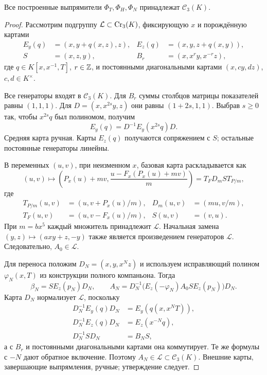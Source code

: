 \begin{proposition}\label{prop:cremona-membership}
Все построенные выпрямители $\Phi_T,\Phi_H,\Phi_N$ принадлежат
$\mathcal C_3(K)$.
\end{proposition}
\begin{proof}
Рассмотрим подгруппу $\mathcal L\subset\operatorname{Cr}_3(K)$,
фиксирующую $x$ и порождённую картами
\[
 \begin{aligned}
 E_y(q)&=(x,y+q(x,z),z),& E_z(q)&=(x,y,z+q(x,y)),\\
 S&=(x,z,y),&B_r&=(x,x^ry,x^{-r}z),
 \end{aligned}
\]
где $q\in K[x,x^{-1},T]$, $r\in{\mathbb Z}$, и постоянными
диагональными картами $(x,cy,dz)$, $c,d\in K^\times$.

Все генераторы входят в $\mathcal C_3(K)$.
Для $B_r$ суммы столбцов матрицы показателей равны $(1,1,1)$.
Для $D=(x,x^{2s}y,z)$ они равны $(1+2s,1,1)$.
Выбрав $s\ge0$ так, чтобы $x^{2s}q$ был полиномом, получим
\[
 E_y(q)=D^{-1}E_y(x^{2s}q)D.
\]
Средняя карта ручная. Карты $E_z(q)$ получаются сопряжением с $S$;
остальные постоянные генераторы линейны.

В переменных $(u,v)$, при неизменном $x$, базовая карта раскладывается как
\[
 (u,v)\longmapsto\left(P_x(u)+mv,
 \frac{u-F_x(P_x(u)+mv)}m\right)
 =T_FD_mST_{P/m},
\]
где
\[
 \begin{aligned}
 T_{P/m}(u,v)&=(u,v+P_x(u)/m),&D_m(u,v)&=(mu,v/m),\\
 T_F(u,v)&=(u,v-F_x(u)/m),&S(u,v)&=(v,u).
 \end{aligned}
\]
При $m=bx^5$ каждый множитель принадлежит $\mathcal L$.
Начальная замена $(y,z)\mapsto(axy+z,-y)$ также является произведением
генераторов $\mathcal L$. Следовательно, $A_0\in\mathcal L$.

Для переноса положим $D_N=(x,y,x^Nz)$ и используем исправляющий
полином $\varphi_N(x,T)$ из конструкции полного компаньона. Тогда
\[
 \beta_N=SE_z(p_N)D_N,\qquad
 A_N=D_N^{-1}\bigl(E_z(-\varphi_N)A_0SE_z(p_N)\bigr)D_N.
\]
Карта $D_N$ нормализует $\mathcal L$, поскольку
\[
 \begin{aligned}
 D_N^{-1}E_y(q)D_N&=E_y(q(x,x^NT)),\\
 D_N^{-1}E_z(q)D_N&=E_z(x^{-N}q),\\
 D_N^{-1}SD_N&=B_NS,
 \end{aligned}
\]
а с $B_r$ и постоянными диагональными картами она коммутирует.
Те же формулы с $-N$ дают обратное включение.
Поэтому $A_N\in\mathcal L\subset\mathcal C_3(K)$.
Внешние карты, завершающие выпрямления, ручные; утверждение следует.
\end{proof}

